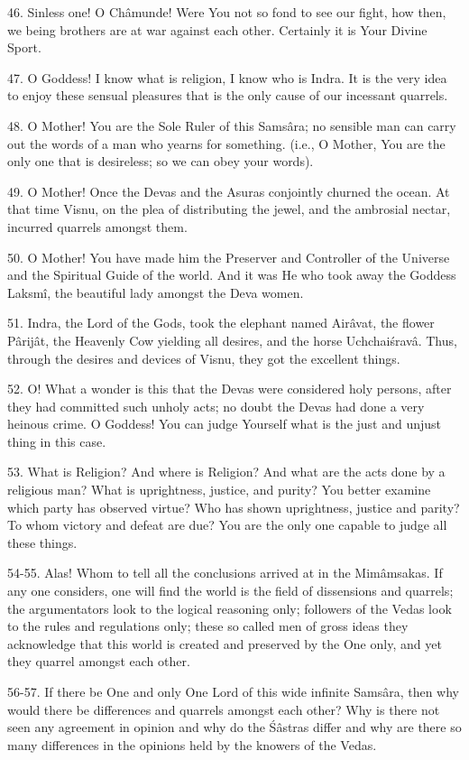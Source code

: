 46. Sinless one! O Ch\^amunde! Were You not so fond to see our fight, how then, we being brothers are at war against each other. Certainly it is Your Divine Sport.

47. O Goddess! I know what is religion, I know who is Indra. It is the very idea to enjoy these sensual pleasures that is the only cause of our incessant quarrels.

48. O Mother! You are the Sole Ruler of this Sams\^ara; no sensible man can carry out the words of a man who yearns for something. (i.e., O Mother, You are the only one that is desireless; so we can obey your words).

49. O Mother! Once the Devas and the Asuras conjointly churned the ocean. At that time Visnu, on the plea of distributing the jewel, and the ambrosial nectar, incurred quarrels amongst them.

50. O Mother! You have made him the Preserver and Controller of the Universe and the Spiritual Guide of the world. And it was He who took away the Goddess Laksm\^i, the beautiful lady amongst the Deva women.

51. Indra, the Lord of the Gods, took the elephant named Air\^avat, the flower P\^arij\^at, the Heavenly Cow yielding all desires, and the horse Uchchai\'srav\^a. Thus, through the desires and devices of Visnu, they got the excellent things.

52. O! What a wonder is this that the Devas were considered holy persons, after they had committed such unholy acts; no doubt the Devas had done a very heinous crime. O Goddess! You can judge Yourself what is the just and unjust thing in this case.

53. What is Religion? And where is Religion? And what are the acts done by a religious man? What is uprightness, justice, and purity? You better examine which party has observed virtue? Who has shown uprightness, justice and parity? To whom victory and defeat are due? You are the only one capable to judge all these things.

54-55. Alas! Whom to tell all the conclusions arrived at in the Mim\^amsakas. If any one considers, one will find the world is the field of dissensions and quarrels; the argumentators look to the logical reasoning only; followers of the Vedas look to the rules and regulations only; these so called men of gross ideas they acknowledge that this world is created and preserved by the One only, and yet they quarrel amongst each other.

56-57. If there be One and only One Lord of this wide infinite Sams\^ara, then why would there be differences and quarrels amongst each other? Why is there not seen any agreement in opinion and why do the \'S\^astras differ and why are there so many differences in the opinions held by the knowers of the Vedas.

